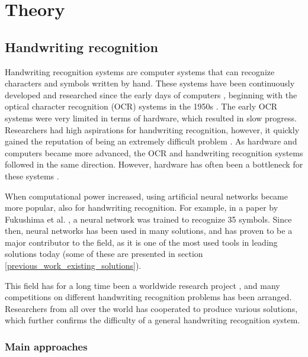 \chapter{Theory}

\section{Handwriting recognition}
\label{handwriting_recognition}

Handwriting recognition systems are computer systems that can recognize characters and symbols written by hand. These systems have been continuously developed and researched since the early days of computers \cite{simon_off-line_1992}, beginning with the optical character recognition (OCR) systems in the 1950s \cite{mori_historical_1992}. The early OCR systems were very limited in terms of hardware, which resulted in slow progress. Researchers had high aspirations for handwriting recognition, however, it quickly gained the reputation of being an extremely difficult problem \cite{simon_off-line_1992}. As hardware and computers became more advanced, the OCR and handwriting recognition systems followed in the same direction. However, hardware has often been a bottleneck for these systems \cite{mori_historical_1992}.

When computational power increased, using artificial neural networks became more popular, also for handwriting recognition. For example, in a paper by Fukushima et al. \cite{fukushima_handwritten_????} , a neural network was trained to recognize 35 symbols. Since then, neural networks has been used in many solutions, and has proven to be a major contributor to the field, as it is one of the most used tools in leading solutions today (some of these are presented in section \ref{previous_work_existing_solutions}).

This field has for a long time been a worldwide research project \cite{mori_historical_1992}, and many competitions on different handwriting recognition problems has been arranged. Researchers from all over the world has cooperated to produce various solutions, which further confirms the difficulty of a general handwriting recognition system. 

\subsection{Main approaches}
\label{main_approaches}

